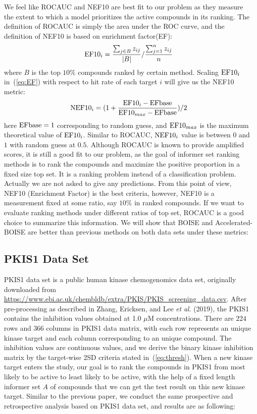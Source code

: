 \documentclass[12pt]{article}
\begin{document}
We feel like ROCAUC and NEF10 are best fit to our problem as they measure the extent to which a model prioritizes the active compounds in its ranking. The definition of ROCAUC is simply the area under the ROC curve, and the definition of NEF10 is based on enrichment factor(EF):
\begin{eqnarray}
\label{eq:EF}
{\rm EF10}_i = \frac{\sum_{j\in B}z_{ij}}{|B|}/\frac{\sum_{j=1}^nz_{ij}}{n}
\end{eqnarray}
where $B$ is the top $10\%$ compounds ranked by certain method. Scaling ${\rm EF10}_i$ in~(\ref{eq:EF}) with respect to hit rate of each target $i$ will give us the NEF10 metric:
\begin{eqnarray}
\label{eq:NEF}
{\rm NEF10}_i = (1+\frac{{\rm EF10}_i - {\rm EFbase}}{{\rm EF10}_{max} -{\rm EFbase} })/2
\end{eqnarray}
here ${\rm EFbase} = 1$ corresponding to random guess, and ${\rm EF10}_{max}$ is the maximum theoretical value of ${\rm EF10}_i$. Similar to ROCAUC, ${\rm NEF10}_i$ value is between $0$ and $1$ with random guess at $0.5$. 
Although ROCAUC is known to provide amplified scores, it is still a good fit to our problem, as the goal of informer set ranking methods is to rank the compounds and maximize the positive proportion in a fixed size top set. It is a ranking problem instead of a classification problem. Actually we are not asked to give any predictions. From this point of view, NEF10 (Enrichment Factor) is the best criteria, however, NEF10 is a measurement fixed at some ratio, say $10\%$ in ranked compounds. If we want to evaluate ranking methods under different ratios of top set, ROCAUC is a good choice to summarize this information. We will show that BOISE and Accelerated-BOISE are better than previous methods on both data sets under these metrics:

\subsection{PKIS1 Data Set}
PKIS1 data set is a public human kinase chemogenomics data set, originally downloaded from \url{https://www.ebi.ac.uk/chembldb/extra/PKIS/PKIS_screening_data.csv}. After pre-processing as described in Zhang, Ericksen, and Lee {\em et al.} (2019), the PKIS1 contains the inhibition values obtained at 1.0 $\mu$M concentrations. There are $224$ rows and $366$ columns in PKIS1 data matrix, with each row represents an unique kinase target and each column corresponding to an unique compound. The inhibition values are continuous values, and we derive the binary kinase inhibition matrix by the target-wise 2SD criteria stated in~(\ref{eq:thresh}). When a new kinase target enters the study, our goal is to rank the compounds in PKIS1 from most likely to be active to least likely to be active, with the help of a fixed length informer set $A$ of compounds that we can get the test result on this new kinase target. Similar to the previous paper, we conduct the same prospective and retrospective analysis based on PKIS1 data set, and results are as following:
\end{document}

